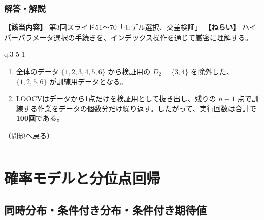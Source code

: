 \subsubsection{解答・解説}\label{ux89e3ux7b54ux89e3ux8aac-9}

\textbf{【該当内容】} 第3回スライド51〜70「モデル選択、交差検証」
\textbf{【ねらい】}
ハイパーパラメータ選択の手続きを、インデックス操作を通じて厳密に理解する。

\begin{answerbox}[phantomlabel=a:3-5-1]{q:3-5-1}

\begin{enumerate}
\def\labelenumi{\arabic{enumi}.}
\tightlist
\item
  全体のデータ \(\{1,2,3,4,5,6\}\) から検証用の \(D_2 = \{3,4\}\)
  を除外した、\textbf{$\{1, 2, 5, 6\}$} が訓練用データとなる。
\item
  LOOCVはデータから1点だけを検証用として抜き出し、残りの \(n-1\)
  点で訓練する作業をデータの個数分だけ繰り返す。したがって、実行回数は合計で\textbf{100回}である。
\end{enumerate}

\hfill 

\hyperref[q:3-5-1]{（問題へ戻る）}

\begin{center}\rule{0.5\linewidth}{0.5pt}\end{center}

\end{answerbox}

\section{確率モデルと分位点回帰}\label{ux78baux7387ux30e2ux30c7ux30ebux3068ux5206ux4f4dux70b9ux56deux5e30}

\subsection{同時分布・条件付き分布・条件付き期待値}\label{ux540cux6642ux5206ux5e03ux6761ux4ef6ux4ed8ux304dux5206ux5e03ux6761ux4ef6ux4ed8ux304dux671fux5f85ux5024}

